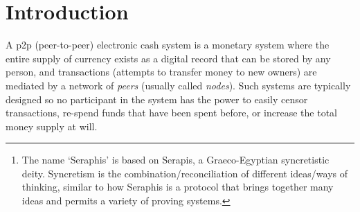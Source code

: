 \begin{abstract}
    Seraphis\footnote{The name `Seraphis' is based on Serapis, a Graeco-Egyptian syncretistic deity. Syncretism is the combination/reconciliation of different ideas/ways of thinking, similar to how Seraphis is a protocol that brings together many ideas and permits a variety of proving systems.} is a privacy-focused transaction protocol abstraction for p2p electronic cash systems that use the transaction output model (the {\em e-note} model in this paper). Seraphis e-notes are amount-transfer devices in the RingCT tradition, which record an `amount' as a Pedersen commitment and an `address with transfer-authority' as a specially-designed prime-order group point (similar to CryptoNote one-time addresses). Unlike previous protocols compatible with CT (Confidential Transactions), where e-note membership, ownership, and unspentness proofs were highly integrated into one large proving structure (such as MLSAG or CLSAG in the case of standard RingCT), Seraphis separates membership proofs from ownership and unspentness proofs. This allows the security model for membership proofs to be abstracted away from any specific proving system, which enables relatively simpler proving structures to be used and greatly simplifies the overall security model of Seraphis compared to its predecessors. Doing so also allows a linking tag (a.k.a.\ key image) construction with a number of favorable properties. Most notably, implementers of Seraphis can use an addressing scheme which permits wallets with three tiers of permissions (view received amounts, full balance recovery, full balance recovery with spend authority). The second permission tier is unique to Seraphis among protocols in the CryptoNote tradition.
\end{abstract}


\section{Introduction}
\label{sec:introduction}

A p2p (peer-to-peer) electronic cash system is a monetary system where the entire supply of currency exists as a digital record that can be stored by any person, and transactions (attempts to transfer money to new owners) are mediated by a network of {\em peers} (usually called {\em nodes}). Such systems are typically designed so no participant in the system has the power to easily censor transactions, re-spend funds that have been spent before, or increase the total money supply at will.

